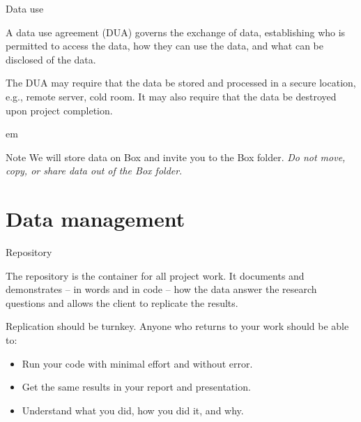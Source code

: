 \documentclass{beamer}
\begin{document}
\begin{frame}{Data use}

  A data use agreement (DUA) governs the exchange of data, establishing who is permitted to access the data, how they can use the data, and what can be disclosed of the data.

  The DUA may require that the data be stored and processed in a secure location, e.g., remote server, cold room. It may also require that the data be destroyed upon project completion.

   em
  \begin{block}{Note}
    We will store data on Box and invite you to the Box folder. \textit{Do not move, copy, or share data out of the Box folder}.
  \end{block}

\end{frame}

\section{Data management}

\begin{frame}{Repository}

  The repository is the container for all project work. It documents and demonstrates -- in words and in code -- how the data answer the research questions and allows the client to replicate the results.

  Replication should be turnkey. Anyone who returns to your work should be able to:

  \begin{itemize}
    \item Run your code with minimal effort and without error.
    \item Get the same results in your report and presentation.
    \item Understand what you did, how you did it, and why.
  \end{itemize}

\end{frame}
\end{document}
